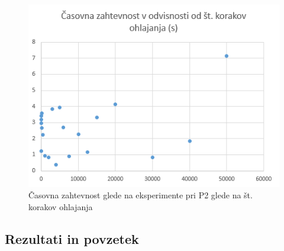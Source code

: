 \documentclass[a4paper, 12 pt]{article}
\begin{document}
\begin{figure}[H]
\centering
  \includegraphics[width=12cm]{casovna_p2_korak.png}
  \caption{Časovna zahtevnost glede na eksperimente pri P2 glede na št. korakov ohlajanja}
  \label{fig:p2_časovna_zaht_korak} 
\end{figure}



\subsection{Rezultati in povzetek}
\end{document}
